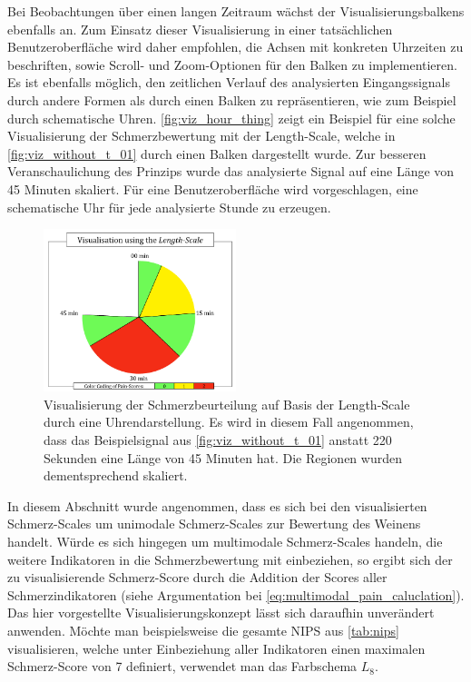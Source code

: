 Bei Beobachtungen über einen langen Zeitraum wächst der Visualisierungsbalkens ebenfalls an. Zum Einsatz dieser Visualisierung in einer tatsächlichen Benutzeroberfläche wird daher empfohlen, die Achsen mit konkreten Uhrzeiten zu beschriften, sowie Scroll- und Zoom-Optionen für den Balken zu implementieren. Es ist ebenfalls möglich, den zeitlichen Verlauf des analysierten Eingangssignals durch andere Formen als durch einen Balken zu repräsentieren, wie zum Beispiel durch schematische Uhren. \autoref{fig:viz_hour_thing} zeigt ein Beispiel für eine solche Visualisierung der Schmerzbewertung mit der Length-Scale, welche in \autoref{fig:viz_without_t_01} durch einen Balken dargestellt wurde. Zur besseren Veranschaulichung des Prinzips wurde das analysierte Signal auf eine Länge von 45 Minuten skaliert. Für eine Benutzeroberfläche wird vorgeschlagen, eine schematische Uhr für jede analysierte Stunde zu erzeugen.

\begin{figure}[h]
	\centering
	\includegraphics[width=0.5\textwidth]{bilder/visualisation_hour_02.png}
	\caption[Visualisierung der Schmerzbeurteilung durch eine schematische Uhr]{Visualisierung der Schmerzbeurteilung auf Basis der Length-Scale durch eine Uhrendarstellung. Es wird in diesem Fall angenommen, dass das Beispielsignal aus \autoref{fig:viz_without_t_01} anstatt 220 Sekunden eine Länge von 45 Minuten hat. Die Regionen wurden dementsprechend skaliert.}
	\label{fig:viz_hour_thing}
\end{figure}

In diesem Abschnitt wurde angenommen, dass es sich bei den visualisierten Schmerz-Scales um unimodale Schmerz-Scales zur Bewertung des Weinens handelt. Würde es sich hingegen um multimodale Schmerz-Scales handeln, die weitere Indikatoren in die Schmerzbewertung mit einbeziehen, so ergibt sich der zu visualisierende Schmerz-Score durch die Addition der Scores aller Schmerzindikatoren (siehe Argumentation bei  \autoref{eq:multimodal_pain_caluclation}). Das hier vorgestellte Visualisierungskonzept lässt sich daraufhin unverändert anwenden. Möchte man beispielsweise die gesamte NIPS aus \autoref{tab:nips} visualisieren, welche unter Einbeziehung aller Indikatoren einen maximalen Schmerz-Score von 7 definiert, verwendet man das Farbschema $L_8$.

